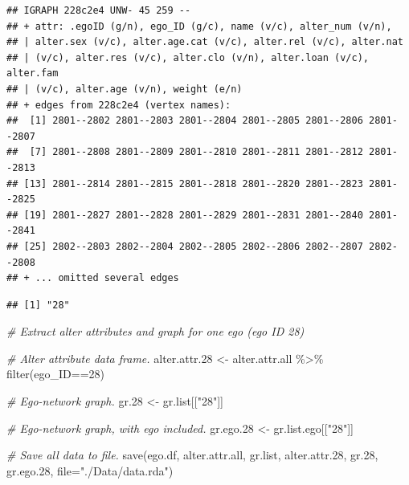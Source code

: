 \documentclass[
]{book}
\newenvironment{Shaded}{\begin{snugshade}}{\end{snugshade}}
\newcommand{\AttributeTok}[1]{\textcolor[rgb]{0.77,0.63,0.00}{#1}}
\newcommand{\CommentTok}[1]{\textcolor[rgb]{0.56,0.35,0.01}{\textit{#1}}}
\newcommand{\DecValTok}[1]{\textcolor[rgb]{0.00,0.00,0.81}{#1}}
\newcommand{\FloatTok}[1]{\textcolor[rgb]{0.00,0.00,0.81}{#1}}
\newcommand{\FunctionTok}[1]{\textcolor[rgb]{0.00,0.00,0.00}{#1}}
\newcommand{\NormalTok}[1]{#1}
\newcommand{\OtherTok}[1]{\textcolor[rgb]{0.56,0.35,0.01}{#1}}
\newcommand{\SpecialCharTok}[1]{\textcolor[rgb]{0.00,0.00,0.00}{#1}}
\newcommand{\StringTok}[1]{\textcolor[rgb]{0.31,0.60,0.02}{#1}}
\begin{document}
\begin{verbatim}
## IGRAPH 228c2e4 UNW- 45 259 -- 
## + attr: .egoID (g/n), ego_ID (g/c), name (v/c), alter_num (v/n),
## | alter.sex (v/c), alter.age.cat (v/c), alter.rel (v/c), alter.nat
## | (v/c), alter.res (v/c), alter.clo (v/n), alter.loan (v/c), alter.fam
## | (v/c), alter.age (v/n), weight (e/n)
## + edges from 228c2e4 (vertex names):
##  [1] 2801--2802 2801--2803 2801--2804 2801--2805 2801--2806 2801--2807
##  [7] 2801--2808 2801--2809 2801--2810 2801--2811 2801--2812 2801--2813
## [13] 2801--2814 2801--2815 2801--2818 2801--2820 2801--2823 2801--2825
## [19] 2801--2827 2801--2828 2801--2829 2801--2831 2801--2840 2801--2841
## [25] 2802--2803 2802--2804 2802--2805 2802--2806 2802--2807 2802--2808
## + ... omitted several edges
\end{verbatim}

\begin{Shaded}
\end{Shaded}

\begin{verbatim}
## [1] "28"
\end{verbatim}

\begin{Shaded}
\begin{Highlighting}[]
\CommentTok{\# Extract alter attributes and graph for one ego (ego ID 28)}

\CommentTok{\# Alter attribute data frame.}
\NormalTok{alter.attr}\FloatTok{.28} \OtherTok{\textless{}{-}}\NormalTok{ alter.attr.all }\SpecialCharTok{\%\textgreater{}\%}
  \FunctionTok{filter}\NormalTok{(ego\_ID}\SpecialCharTok{==}\DecValTok{28}\NormalTok{)}

\CommentTok{\# Ego{-}network graph.}
\NormalTok{gr}\FloatTok{.28} \OtherTok{\textless{}{-}}\NormalTok{ gr.list[[}\StringTok{"28"}\NormalTok{]]}

\CommentTok{\# Ego{-}network graph, with ego included.}
\NormalTok{gr.ego}\FloatTok{.28} \OtherTok{\textless{}{-}}\NormalTok{ gr.list.ego[[}\StringTok{"28"}\NormalTok{]]}

\CommentTok{\# Save all data to file.}
\FunctionTok{save}\NormalTok{(ego.df, alter.attr.all, gr.list, alter.attr}\FloatTok{.28}\NormalTok{, gr}\FloatTok{.28}\NormalTok{, gr.ego}\FloatTok{.28}\NormalTok{, }\AttributeTok{file=}\StringTok{"./Data/data.rda"}\NormalTok{)}
\end{Highlighting}
\end{Shaded}
\end{document}

